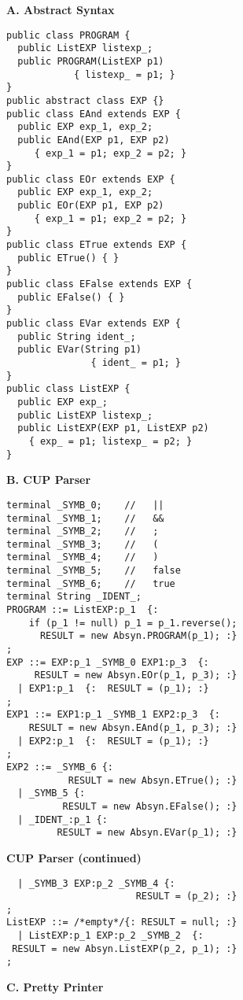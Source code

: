 \begin{figure}
\begin{boxedminipage}[t]{\textwidth}
\begin{minipage}[l]{0.5\textwidth}
\normalsize
\textbf{A. Abstract Syntax}
\scriptsize
\begin{verbatim}
public class PROGRAM {
  public ListEXP listexp_;
  public PROGRAM(ListEXP p1)
            { listexp_ = p1; }
}
public abstract class EXP {}
public class EAnd extends EXP {
  public EXP exp_1, exp_2;
  public EAnd(EXP p1, EXP p2)
     { exp_1 = p1; exp_2 = p2; }
}
public class EOr extends EXP {
  public EXP exp_1, exp_2;
  public EOr(EXP p1, EXP p2)
     { exp_1 = p1; exp_2 = p2; }
}
public class ETrue extends EXP {
  public ETrue() { }
}
public class EFalse extends EXP {
  public EFalse() { }
}
public class EVar extends EXP {
  public String ident_;
  public EVar(String p1)
               { ident_ = p1; }
}
public class ListEXP {
  public EXP exp_;
  public ListEXP listexp_;
  public ListEXP(EXP p1, ListEXP p2)
    { exp_ = p1; listexp_ = p2; }
}
\end{verbatim}
\normalsize
\textbf{B. CUP Parser}
\scriptsize
\begin{verbatim}
terminal _SYMB_0;    //   ||
terminal _SYMB_1;    //   &&
terminal _SYMB_2;    //   ;
terminal _SYMB_3;    //   (
terminal _SYMB_4;    //   )
terminal _SYMB_5;    //   false
terminal _SYMB_6;    //   true
terminal String _IDENT_;
PROGRAM ::= ListEXP:p_1  {:
    if (p_1 != null) p_1 = p_1.reverse();
      RESULT = new Absyn.PROGRAM(p_1); :}
;
EXP ::= EXP:p_1 _SYMB_0 EXP1:p_3  {:
     RESULT = new Absyn.EOr(p_1, p_3); :}
  | EXP1:p_1  {:  RESULT = (p_1); :}
;
EXP1 ::= EXP1:p_1 _SYMB_1 EXP2:p_3  {:
    RESULT = new Absyn.EAnd(p_1, p_3); :}
  | EXP2:p_1  {:  RESULT = (p_1); :}
;
EXP2 ::= _SYMB_6 {:
           RESULT = new Absyn.ETrue(); :}
  | _SYMB_5 {:
          RESULT = new Absyn.EFalse(); :}
  | _IDENT_:p_1 {:
         RESULT = new Absyn.EVar(p_1); :}
\end{verbatim}
\normalsize
\end{minipage}
\hfill
\begin{minipage}[r]{0.5\textwidth}
\normalsize
\textbf{CUP Parser (continued)}
\scriptsize
\begin{verbatim}
  | _SYMB_3 EXP:p_2 _SYMB_4 {:
                       RESULT = (p_2); :}
;
ListEXP ::= /*empty*/{: RESULT = null; :}
  | ListEXP:p_1 EXP:p_2 _SYMB_2  {:
 RESULT = new Absyn.ListEXP(p_2, p_1); :}
;
\end{verbatim}
\normalsize
\textbf{C. Pretty Printer}

\end{minipage}
\end{boxedminipage}
\end{figure}
